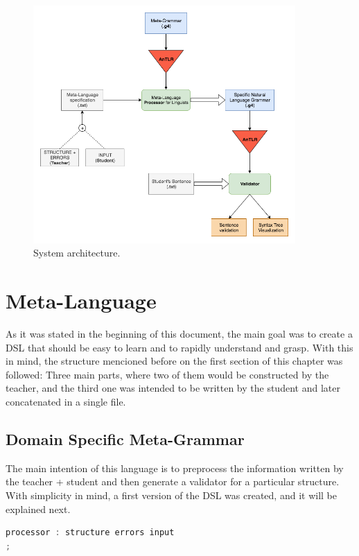 \begin{figure}[h]
    \centering
    \includegraphics[width=10cm]{images/msc_system_architecture.png}
    \caption{System architecture.}
    \label{fig:system_architecture}
\end{figure}

\section{Meta-Language}
As it was stated in the beginning of this document, the main goal was to create a \textsc{DSL} that should be easy to learn and to rapidly understand and grasp. With this in mind, the structure mencioned before on the first section
of this chapter was followed: Three main parts, where two of them would be constructed by the teacher, and the third one was intended to be written by the student and later concatenated in a single file.

\subsection{Domain Specific Meta-Grammar}
The main intention of this language is to preprocess the information written by the teacher + student and then generate a validator for a particular structure. With simplicity in mind, a first version of the \textsc{DSL} was created, and it will be explained next.

\begin{center}
\begin{minipage}{8cm}
\begin{lstlisting}[language=java, basicstyle=\small, label={lst:processor_prod}, caption=Processor production]
processor : structure errors input
;
\end{lstlisting}
\end{minipage}
\end{center}


